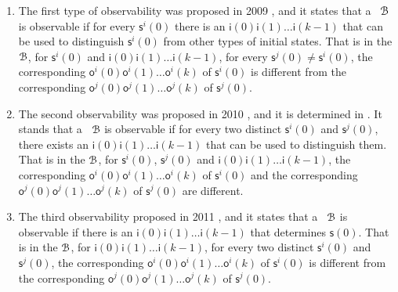 \begin{enumerate}
	\item The first type of observability was proposed in 2009 \cite{cheng2009controllability}, and it states that a \BCN\ ${\mathcal{B}}$ is observable if for every $\mathsf{s}^{i}(0)$ there is an $\mathsf{i}(0)\mathsf{i}(1)\ldots\mathsf{i}(k-1)$ that can be used to distinguish $\mathsf{s}^{i}(0)$ from other types of initial states. That is in the ${\mathcal{B}}$, for $\mathsf{s}^{i}(0)$ and $\mathsf{i}(0)$$\mathsf{i}(1)\ldots$$\mathsf{i}(k-1)$, for every $\mathsf{s}^{j}(0)\ne$$\mathsf{s}^{i}(0)$, the corresponding $\mathsf{o}^{i}(0)$$\mathsf{o}^{i}(1)\ldots$$\mathsf{o}^{i}(k)$ of $\mathsf{s}^{i}(0)$ is different from the corresponding $\mathsf{o}^{j}(0)$$\mathsf{o}^{j}(1)\ldots$$\mathsf{o}^{j}(k)$ of $\mathsf{s}^{j}(0)$. %
	\item 
	The second observability was proposed in 2010 \cite{Zhao2010Input}, and it is determined in \cite{Li2015Controllability}. It stands that a \BCN\ ${\mathcal{B}}$ is observable if for every two distinct $\mathsf{s}^{i}(0)$ and $\mathsf{s}^{j}(0)$, there exists an $\mathsf{i}(0)$$\mathsf{i}(1)\ldots$$\mathsf{i}(k-1)$ that can be used to distinguish them. That is in the ${\mathcal{B}}$, for $\mathsf{s}^{i}(0)$, $\mathsf{s}^{j}(0)$ and $\mathsf{i}(0)\mathsf{i}(1)\ldots\mathsf{i}(k-1)$, the corresponding $\mathsf{o}^{i}(0)\mathsf{o}^{i}(1)\ldots\mathsf{o}^{i}(k)$ of $\mathsf{s}^{i}(0)$ and the corresponding $\mathsf{o}^{j}(0)\mathsf{o}^{j}(1)\ldots\mathsf{o}^{j}(k)$ of $\mathsf{s}^{j}(0)$ are different. %
	\item The third observability proposed in 2011 \cite{Cheng2011Identification}, and it states that a \BCN\ ${\mathcal{B}}$ is observable if there is an $\mathsf{i}(0)$$\mathsf{i}(1)\ldots$$\mathsf{i}(k-1)$ that determines $\mathsf{s}(0)$. That is in the ${\mathcal{B}}$, for $\mathsf{i}(0)$$\mathsf{i}(1)\ldots$$\mathsf{i}(k-1)$, for every two distinct $\mathsf{s}^{i}(0)$ and $\mathsf{s}^{j}(0)$, the corresponding $\mathsf{o}^{i}(0)$$\mathsf{o}^{i}(1)\ldots$$\mathsf{o}^{i}(k)$ of $\mathsf{s}^{i}(0)$ is different from the corresponding $\mathsf{o}^{j}(0)$$\mathsf{o}^{j}(1)\ldots$$\mathsf{o}^{j}(k)$ of $\mathsf{s}^{j}(0)$.
	

\end{enumerate}
